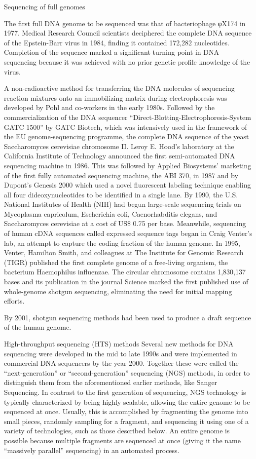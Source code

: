 Sequencing of full genomes

The first full DNA genome to be sequenced was that of bacteriophage φX174 in 1977. Medical Research Council scientists deciphered the complete DNA sequence of the Epstein-Barr virus in 1984, finding it contained 172,282 nucleotides. Completion of the sequence marked a significant turning point in DNA sequencing because it was achieved with no prior genetic profile knowledge of the virus.

A non-radioactive method for transferring the DNA molecules of sequencing reaction mixtures onto an immobilizing matrix during electrophoresis was developed by Pohl and co-workers in the early 1980s. Followed by the commercialization of the DNA sequencer ``Direct-Blotting-Electrophoresis-System GATC 1500'' by GATC Biotech, which was intensively used in the framework of the EU genome-sequencing programme, the complete DNA sequence of the yeast Saccharomyces cerevisiae chromosome II. Leroy E. Hood's laboratory at the California Institute of Technology announced the first semi-automated DNA sequencing machine in 1986. This was followed by Applied Biosystems' marketing of the first fully automated sequencing machine, the ABI 370, in 1987 and by Dupont's Genesis 2000 which used a novel fluorescent labeling technique enabling all four dideoxynucleotides to be identified in a single lane. By 1990, the U.S. National Institutes of Health (NIH) had begun large-scale sequencing trials on Mycoplasma capricolum, Escherichia coli, Caenorhabditis elegans, and Saccharomyces cerevisiae at a cost of US\$ 0.75 per base. Meanwhile, sequencing of human cDNA sequences called expressed sequence tags began in Craig Venter's lab, an attempt to capture the coding fraction of the human genome. In 1995, Venter, Hamilton Smith, and colleagues at The Institute for Genomic Research (TIGR) published the first complete genome of a free-living organism, the bacterium Haemophilus influenzae. The circular chromosome contains 1,830,137 bases and its publication in the journal Science marked the first published use of whole-genome shotgun sequencing, eliminating the need for initial mapping efforts.

By 2001, shotgun sequencing methods had been used to produce a draft sequence of the human genome.

High-throughput sequencing (HTS) methods
Several new methods for DNA sequencing were developed in the mid to late 1990s and were implemented in commercial DNA sequencers by the year 2000. Together these were called the ``next-generation'' or ``second-generation'' sequencing (NGS) methods, in order to distinguish them from the aforementioned earlier methods, like Sanger Sequencing. In contrast to the first generation of sequencing, NGS technology is typically characterized by being highly scalable, allowing the entire genome to be sequenced at once. Usually, this is accomplished by fragmenting the genome into small pieces, randomly sampling for a fragment, and sequencing it using one of a variety of technologies, such as those described below. An entire genome is possible because multiple fragments are sequenced at once (giving it the name ``massively parallel'' sequencing) in an automated process.

